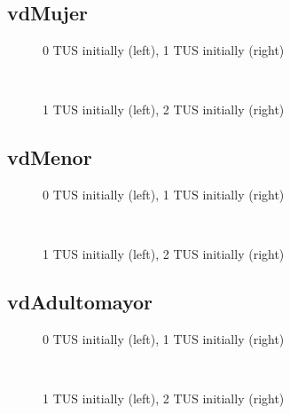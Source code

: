 \documentclass[12pt]{article}
\begin{document}
\subsection{vdMujer}
\begin{figure}[H]%
	\centering
	\caption*{0 TUS initially (left), 1 TUS initially (right)}
	 \quad 
	 \\
	
	\caption*{1 TUS initially (left), 2 TUS initially (right)}
	 \qquad
	\label{fig:vdMujerTwo}%
\end{figure}

\subsection{vdMenor}
\begin{figure}[H]%
	\centering
	\caption*{0 TUS initially (left), 1 TUS initially (right)}
	 \quad 
	 \\
	
	\caption*{1 TUS initially (left), 2 TUS initially (right)}
	 \qquad
	\label{fig:vdMenorTwo}%
\end{figure}

\subsection{vdAdultomayor}
\begin{figure}[H]%
	\centering
	\caption*{0 TUS initially (left), 1 TUS initially (right)}
	 \quad 
	 \\
	
	\caption*{1 TUS initially (left), 2 TUS initially (right)}
	 \qquad
	\label{fig:vdAdultomayorTwo}%
\end{figure}
\end{document}
